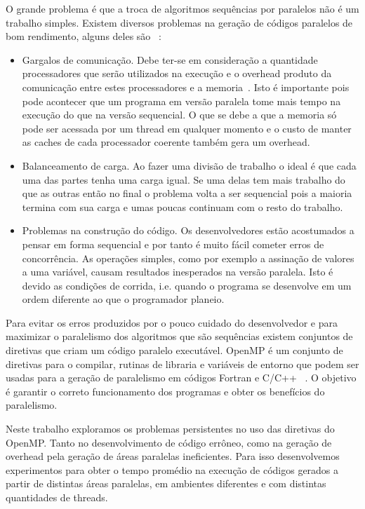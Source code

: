 \documentclass[a4paper,12pt,fleqn]{article}
\begin{document}
O grande problema é que a troca de algoritmos sequências por paralelos não é um trabalho simples. Existem diversos problemas na geração de códigos paralelos de bom rendimento, alguns deles são ~\cite{Matloff14}: 
\begin{itemize} 
\item Gargalos de comunicação. Debe ter-se em consideração a quantidade processadores que serão utilizados na execução e o overhead produto da comunicação entre estes processadores e a memoria~\cite{Gebali11}. Isto é importante pois pode acontecer que um programa em versão paralela tome mais tempo na execução do que na versão sequencial. O que se debe a que a memoria só pode ser acessada por um thread em qualquer momento e o custo de manter as caches de cada processador coerente também gera um overhead. 
\item Balanceamento de carga. Ao fazer uma divisão de trabalho o ideal é que cada uma das partes tenha uma carga igual. Se uma delas tem mais trabalho do que as outras então no final o problema volta a ser sequencial pois a maioria termina com sua carga e umas poucas continuam com o resto do trabalho. 
\item Problemas na construção do código. Os desenvolvedores estão acostumados a pensar em forma sequencial e por tanto é muito fácil cometer erros de 
concorrência. As operações simples, como por exemplo a assinação de valores a uma variável, causam resultados inesperados na versão paralela. Isto é devido as condições de corrida, i.e. quando o programa se desenvolve em um ordem diferente ao que o programador planeio. 
\end{itemize} 
 Para evitar os erros produzidos por o pouco cuidado do desenvolvedor e para maximizar o paralelismo dos algoritmos que são sequências existem conjuntos de diretivas que criam um código paralelo executável. OpenMP é um conjunto de diretivas para o compilar, rutinas de libraria e variáveis de entorno que podem ser usadas para a geração de paralelismo em códigos Fortran e C/C++ ~\cite{OpenMP13}. O objetivo é garantir o correto funcionamento dos programas e obter os benefícios do paralelismo. 
 
Neste trabalho exploramos os problemas persistentes no uso das diretivas do OpenMP. Tanto no desenvolvimento de código errôneo, como na geração de overhead pela geração de áreas paralelas ineficientes. Para isso desenvolvemos experimentos para obter o tempo promédio na execução de códigos gerados a partir de distintas áreas paralelas, em ambientes diferentes e com distintas quantidades de threads.  
 
\end{document}
